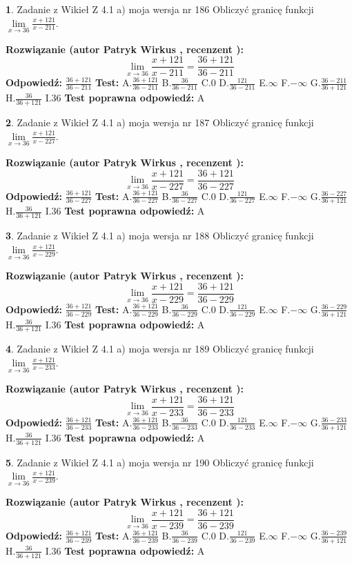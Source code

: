 \documentclass[12pt, a4paper]{article}
\theoremstyle{definition} %
\newtheorem{zad}{}
\newcommand{\zadStart}[1]{\begin{zad}#1\newline}
\newcommand{\zadStop}{\end{zad}}
\newcommand{\rozwStart}[2]{\noindent \textbf{Rozwiązanie (autor #1 , recenzent #2): }\newline}
\newcommand{\rozwStop}{\newline}
\newcommand{\odpStart}{\noindent \textbf{Odpowiedź:}\newline}
\newcommand{\odpStop}{\newline}
\newcommand{\testStart}{\noindent \textbf{Test:}\newline}
\newcommand{\testStop}{\newline}
\newcommand{\kluczStart}{\noindent \textbf{Test poprawna odpowiedź:}\newline}
\newcommand{\kluczStop}{\newline}
\begin{document}
\zadStart{Zadanie z Wikieł Z 4.1 a) moja wersja nr 186}
Obliczyć granicę funkcji $\lim\limits_{x\to36}\frac{x+121}{x-211}$.
\zadStop
\rozwStart{Patryk Wirkus}{}
$$\lim\limits_{x\to36}\frac{x+121}{x-211} = \frac{36+121}{36-211}$$
\rozwStop
\odpStart
$\frac{36+121}{36-211}$
\odpStop
\testStart
A.$\frac{36+121}{36-211}$
B.$\frac{36}{36-211}$
C.$0$
D.$\frac{121}{36-211}$
E.$\infty$
F.$-\infty$
G.$\frac{36-211}{36+121}$
H.$\frac{36}{36+121}$
I.$36$
\testStop
\kluczStart
A
\kluczStop



\zadStart{Zadanie z Wikieł Z 4.1 a) moja wersja nr 187}
Obliczyć granicę funkcji $\lim\limits_{x\to36}\frac{x+121}{x-227}$.
\zadStop
\rozwStart{Patryk Wirkus}{}
$$\lim\limits_{x\to36}\frac{x+121}{x-227} = \frac{36+121}{36-227}$$
\rozwStop
\odpStart
$\frac{36+121}{36-227}$
\odpStop
\testStart
A.$\frac{36+121}{36-227}$
B.$\frac{36}{36-227}$
C.$0$
D.$\frac{121}{36-227}$
E.$\infty$
F.$-\infty$
G.$\frac{36-227}{36+121}$
H.$\frac{36}{36+121}$
I.$36$
\testStop
\kluczStart
A
\kluczStop



\zadStart{Zadanie z Wikieł Z 4.1 a) moja wersja nr 188}
Obliczyć granicę funkcji $\lim\limits_{x\to36}\frac{x+121}{x-229}$.
\zadStop
\rozwStart{Patryk Wirkus}{}
$$\lim\limits_{x\to36}\frac{x+121}{x-229} = \frac{36+121}{36-229}$$
\rozwStop
\odpStart
$\frac{36+121}{36-229}$
\odpStop
\testStart
A.$\frac{36+121}{36-229}$
B.$\frac{36}{36-229}$
C.$0$
D.$\frac{121}{36-229}$
E.$\infty$
F.$-\infty$
G.$\frac{36-229}{36+121}$
H.$\frac{36}{36+121}$
I.$36$
\testStop
\kluczStart
A
\kluczStop



\zadStart{Zadanie z Wikieł Z 4.1 a) moja wersja nr 189}
Obliczyć granicę funkcji $\lim\limits_{x\to36}\frac{x+121}{x-233}$.
\zadStop
\rozwStart{Patryk Wirkus}{}
$$\lim\limits_{x\to36}\frac{x+121}{x-233} = \frac{36+121}{36-233}$$
\rozwStop
\odpStart
$\frac{36+121}{36-233}$
\odpStop
\testStart
A.$\frac{36+121}{36-233}$
B.$\frac{36}{36-233}$
C.$0$
D.$\frac{121}{36-233}$
E.$\infty$
F.$-\infty$
G.$\frac{36-233}{36+121}$
H.$\frac{36}{36+121}$
I.$36$
\testStop
\kluczStart
A
\kluczStop



\zadStart{Zadanie z Wikieł Z 4.1 a) moja wersja nr 190}
Obliczyć granicę funkcji $\lim\limits_{x\to36}\frac{x+121}{x-239}$.
\zadStop
\rozwStart{Patryk Wirkus}{}
$$\lim\limits_{x\to36}\frac{x+121}{x-239} = \frac{36+121}{36-239}$$
\rozwStop
\odpStart
$\frac{36+121}{36-239}$
\odpStop
\testStart
A.$\frac{36+121}{36-239}$
B.$\frac{36}{36-239}$
C.$0$
D.$\frac{121}{36-239}$
E.$\infty$
F.$-\infty$
G.$\frac{36-239}{36+121}$
H.$\frac{36}{36+121}$
I.$36$
\testStop
\kluczStart
A
\kluczStop
\end{document}
